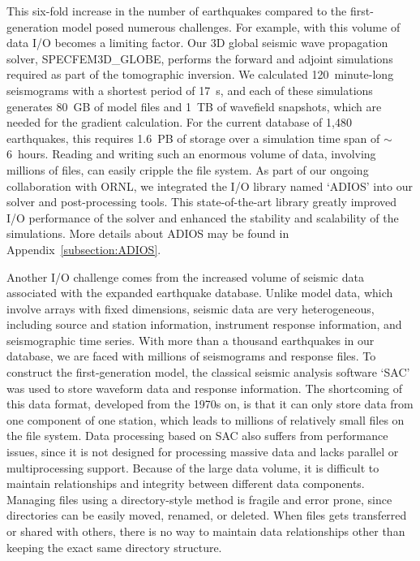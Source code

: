 This six-fold increase in the number of earthquakes compared to the first-generation model
posed numerous challenges.
For example, with this volume of data I/O becomes a limiting factor.
Our 3D global seismic wave propagation solver, SPECFEM3D\_GLOBE,
performs the forward and adjoint simulations required as part of the tomographic inversion.
We calculated 120~minute-long seismograms with a shortest period of 17~s,
and each of these simulations generates 80~GB of model files and 1~TB of wavefield snapshots,
which are needed for the gradient calculation.
For the current database of 1,480 earthquakes, this requires 1.6~PB of storage over a simulation time span of $\sim$6~hours.
Reading and writing such an enormous volume of data, involving millions of files, can easily cripple the file system.
As part of our ongoing collaboration with ORNL,
we integrated the I/O library named `ADIOS' into our solver and post-processing tools.
This state-of-the-art library greatly improved I/O performance of the solver and enhanced the stability and scalability of the simulations.
More details about ADIOS may be found in Appendix~\ref{subsection:ADIOS}.

Another I/O challenge comes from the increased volume of seismic data associated with the expanded earthquake database.
Unlike model data, which involve arrays with fixed dimensions,
seismic data are very heterogeneous, including source and station information,
instrument response information, and seismographic time series.
With more than a thousand earthquakes in our database, we are faced with millions
of seismograms and response files.
To construct the first-generation model,
the classical seismic analysis software `SAC' was used to store waveform data and
response information.
The shortcoming of this data format,
developed from the 1970s on, is that it can only store 
data from one component of one station, which leads to millions of relatively small files on
the file system.
Data processing based on SAC also suffers from performance issues, since it is
not designed for processing massive data and lacks parallel
or multiprocessing support.
Because of the large data volume,
it is difficult to maintain relationships and integrity between
different data components.
Managing files using a directory-style method is fragile and
error prone, since directories
can be easily moved, renamed, or deleted.
When files gets transferred or shared with others, there is no way to maintain
data relationships other than keeping the exact same directory structure.

